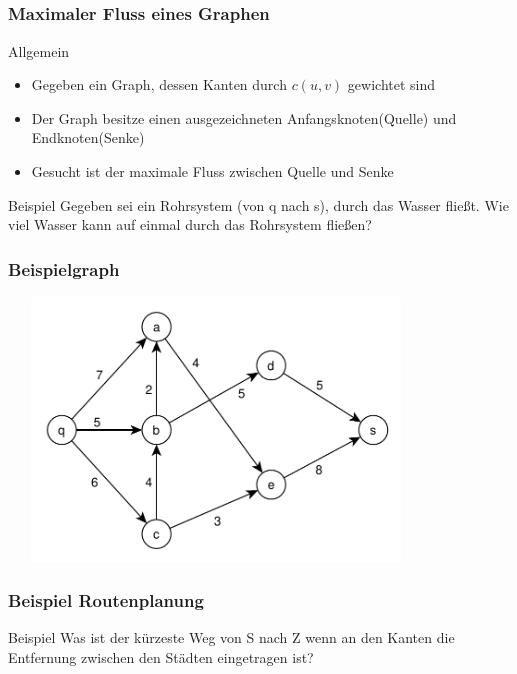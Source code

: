 \subsection*{}
\begin{frame}
\frametitle{Maximaler Fluss eines Graphen}

	\begin{block}{Allgemein}
		\begin{itemize}
          \item Gegeben ein Graph, dessen Kanten durch $c(u,v)$ gewichtet sind \pause
          \item Der Graph besitze einen ausgezeichneten Anfangsknoten(Quelle)
          und Endknoten(Senke) \pause
          \item Gesucht ist der maximale Fluss zwischen Quelle und Senke
          \end{itemize}
	\end{block}
\pause
	\begin{block}{Beispiel}
		Gegeben sei ein Rohrsystem (von q nach s), durch das Wasser fließt. Wie viel
		Wasser kann auf einmal durch das Rohrsystem fließen?
	\end{block}
\end{frame}

\begin{frame}
\frametitle{Beispielgraph}
	\begin{center}
		\includegraphics[width=11cm,
		height=7cm,keepaspectratio=true]{src/tut07_fluss_1}
	\end{center}
\end{frame}

\begin{frame}
\frametitle{Beispiel Routenplanung}
	\begin{block}{Beispiel}
		Was ist der kürzeste Weg von S nach Z wenn an den Kanten die Entfernung zwischen den Städten eingetragen ist?
	\end{block}
\end{frame}

